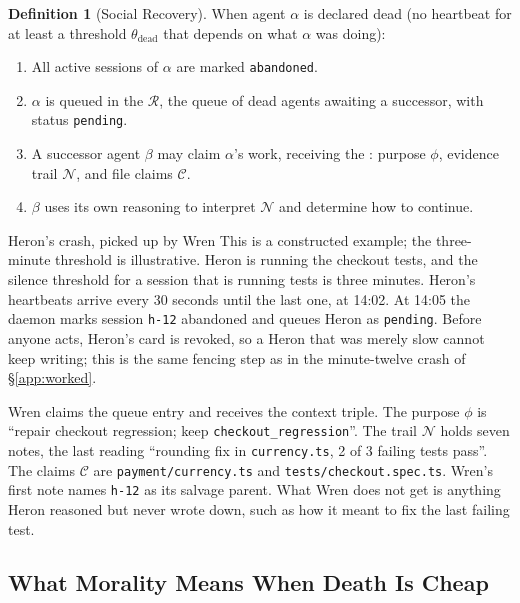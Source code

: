 \documentclass[11pt,a4paper]{article}
\theoremstyle{definition}
\newtheorem{definition}{Definition}[section]
\theoremstyle{remark}
\begin{document}
\begin{definition}[Social Recovery]\label{def:social-recovery}
\setlength{\parskip}{4pt plus 1pt}
When agent $\alpha$ is declared dead (no heartbeat for at least a threshold $\theta_{\text{dead}}$ that depends on what $\alpha$ was doing):
\begin{enumerate}[nosep]
  \item All active sessions of $\alpha$ are marked \texttt{abandoned}.
  \item $\alpha$ is queued in the  $\mathcal{R}$, the queue of dead agents awaiting a successor, with status \texttt{pending}.
  \item A successor agent $\beta$ may claim $\alpha$'s work, receiving the : purpose $\phi$, evidence trail $\mathcal{N}$, and file claims $\mathcal{C}$.
  \item $\beta$ uses its own reasoning to interpret $\mathcal{N}$ and determine how to continue.
\end{enumerate}
\end{definition}

\begin{pdexample}{Heron's crash, picked up by Wren}
This is a constructed example; the three-minute threshold is illustrative.
Heron is running the checkout tests, and the silence threshold for a session
that is running tests is three minutes. Heron's heartbeats arrive every 30
seconds until the last one, at 14:02. At 14:05 the daemon marks session
\texttt{h-12} abandoned and queues Heron as \texttt{pending}. Before anyone
acts, Heron's card is revoked, so a Heron that was merely slow cannot keep
writing; this is the same fencing step as in the minute-twelve crash of
\S\ref{app:worked}.

Wren claims the queue entry and receives the context triple. The purpose
$\phi$ is ``repair checkout regression; keep \texttt{checkout\_regression}''.
The trail $\mathcal{N}$ holds seven notes, the last reading ``rounding fix in
\texttt{currency.ts}, 2 of 3 failing tests pass''. The claims $\mathcal{C}$ are
\texttt{payment/currency.ts} and \texttt{tests/checkout.spec.ts}. Wren's first
note names \texttt{h-12} as its salvage parent. What Wren does not get is anything
Heron reasoned but never wrote down, such as how it meant to fix the last
failing test.
\end{pdexample}

\subsection{What Morality Means When Death Is Cheap}\label{sec:morality}
\end{document}
